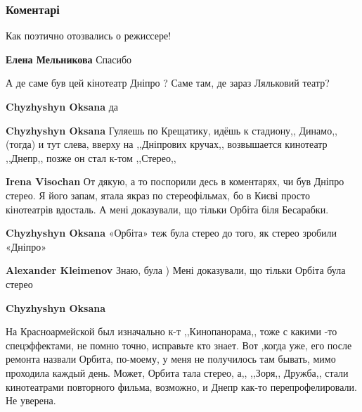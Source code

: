  
 
 
 
 
\subsubsection{Коментарі}

\begin{itemize} %
Как поэтично отозвались о режиссере!

\textbf{Елена Мельникова} Спасибо

А де саме був цей кінотеатр Дніпро ?
Саме там, де зараз Ляльковий театр?

\begin{itemize} %
\textbf{Chyzhyshyn Oksana} да

\textbf{Chyzhyshyn Oksana} Гуляешь по Крещатику, идёшь к стадиону,, Динамо,,(тогда) и тут слева, вверху на ,,Дніпрових кручах,, возвышается кинотеатр ,,Днепр,, позже он стал к-том ,,Стерео,,

\begin{itemize} %
\textbf{Irena Visochan}
От дякую, а то поспорили десь в коментарях, чи був Дніпро стерео.
Я його запам, ятала якраз по стереофільмах, бо в Києві просто кінотеатрів вдосталь.
А мені доказували, що тільки Орбіта біля Бесарабки.

\textbf{Chyzhyshyn Oksana} «Орбіта» теж була стерео до того, як стерео зробили «Дніпро»

\textbf{Alexander Kleimenov}
Знаю, була )
Мені доказували, що тільки Орбіта була стерео

\textbf{Chyzhyshyn Oksana} 

На Красноармейской был изначально к-т ,,Кинопанорама,, тоже с какими -то
спецэффектами, не помню точно, исправьте кто знает. Вот ,когда уже, его после
ремонта назвали Орбита, по-моему, у меня не получилось там бывать, мимо проходила
каждый день. Может, Орбита тала стерео, а,, ,,Зоря,, Дружба,, стали кинотеатрами
повторного фильма, возможно, и Днепр как-то перепрофелировали. Не уверена.



\end{itemize}
\end{itemize}
\end{itemize}
